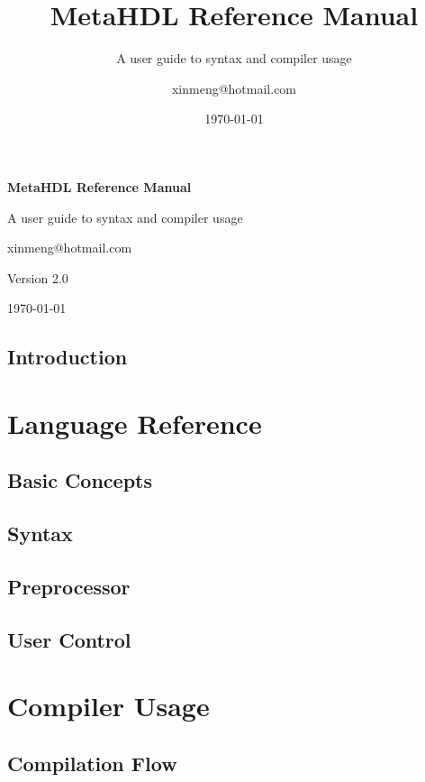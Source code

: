 \documentclass[10pt,oneside]{elegantbook}
\title{MetaHDL Reference Manual}
\subtitle{A user guide to syntax and compiler usage}
\author{xinmeng@hotmail.com}
\date{\today}
\begin{document}
\begin{titlepage}
\thispagestyle{empty}
\vspace*{\fill}
\begin{center}
{\Huge\bfseries MetaHDL Reference Manual\par}
\vspace{1em}
{\Large A user guide to syntax and compiler usage\par}
\vspace{3em}
{\large xinmeng@hotmail.com\par}
\vspace{1em}
{\large Version 2.0\par}
\vspace{1em}
{\large \today\par}
\end{center}
\vspace*{\fill}
\end{titlepage}
\frontmatter
\tableofcontents
\mainmatter
\chapter{Introduction}\label{sec:intro}
\part{Language Reference}
\chapter{Basic Concepts}\label{sec:basic concepts}
\chapter{Syntax}\label{sec:syntax}
\chapter{Preprocessor}\label{sec:pp}
\chapter{User Control}\label{sec:user control}

\part{Compiler Usage}
\chapter{Compilation Flow}\label{sec:flow}
\end{document}
